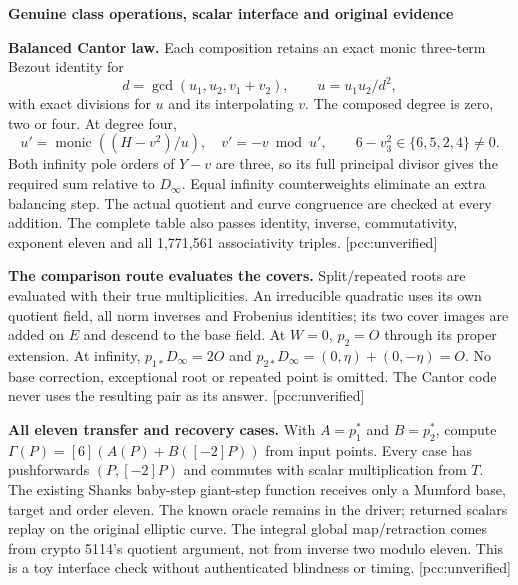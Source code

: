 \documentclass[10pt,a4paper]{article}
\begin{document}
\newpage
{\Large\bfseries Genuine class operations, scalar interface and original evidence}\par

\textbf{Balanced Cantor law.} Each composition retains an exact monic
three-term Bezout identity for
\[
d=\gcd(u_1,u_2,v_1+v_2),\qquad u=u_1u_2/d^2,
\]
with exact divisions for $u$ and its interpolating $v$. The composed
degree is zero, two or four. At degree four,
\[
u'=\operatorname{monic}((H-v^2)/u),\quad v'=-v\bmod u',\qquad
6-v_3^2\in\{6,5,2,4\}\ne0.
\]
Both infinity pole orders of $Y-v$ are three, so its full principal
divisor gives the required sum relative to $D_\infty$. Equal infinity
counterweights eliminate an extra balancing step. The actual quotient
and curve congruence are checked at every addition. The complete table
also passes identity, inverse, commutativity, exponent eleven and all
1,771,561 associativity triples. [pcc:unverified]

\textbf{The comparison route evaluates the covers.} Split/repeated roots
are evaluated with their true multiplicities. An irreducible quadratic
uses its own quotient field, all norm inverses and Frobenius identities;
its two cover images are added on $E$ and descend to the base field.
At $W=0$, $p_2=O$ through its proper extension. At infinity,
$p_{1*}D_\infty=2O$ and $p_{2*}D_\infty=(0,\eta)+(0,-\eta)=O$.
No base correction, exceptional root or repeated point is omitted.
The Cantor code never uses the resulting pair as its answer.
[pcc:unverified]

\textbf{All eleven transfer and recovery cases.} With $A=p_1^*$ and
$B=p_2^*$, compute $\Gamma(P)=[6](A(P)+B([-2]P))$ from input points.
Every case has pushforwards $(P,[-2]P)$ and commutes with scalar
multiplication from $T$. The existing Shanks baby-step giant-step
function receives only a Mumford base, target and order eleven. The
known oracle remains in the driver; returned scalars replay on the
original elliptic curve. The integral global map/retraction comes from
crypto 5114's quotient argument, not from inverse two modulo eleven.
This is a toy interface check without authenticated blindness or timing.
[pcc:unverified]
\end{document}
